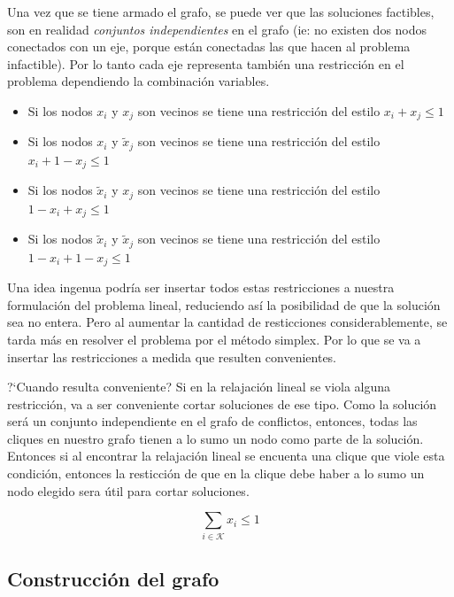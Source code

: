 Una vez que se tiene armado el grafo, se puede ver que las soluciones factibles, son en realidad \emph{conjuntos independientes} en el grafo
(ie: no existen dos nodos conectados con un eje, porque est\'an conectadas las que hacen al problema infactible). Por lo tanto cada eje representa
tambi\'en una restricci\'on en el problema dependiendo la combinaci\'on variables.

\begin{itemize}
\item Si los nodos $x_i$ y $x_j$ son vecinos se tiene una restricci\'on del estilo $x_i +x_j \leq 1$
\item Si los nodos $x_i$ y $\tilde{x}_j$ son vecinos se tiene una restricci\'on del estilo $x_i + 1-x_j \leq 1$
\item Si los nodos $\tilde{x}_i$ y $x_j$ son vecinos se tiene una restricci\'on del estilo $1-x_i +x_j \leq 1$
\item Si los nodos $\tilde{x}_i$ y $\tilde{x}_j$ son vecinos se tiene una restricci\'on del estilo $1-x_i + 1-x_j \leq 1$
\end{itemize}

Una idea ingenua podr\'ia ser insertar todos estas restricciones a nuestra formulaci\'on del problema lineal, reduciendo as\'i la posibilidad de que la soluci\'on sea no entera.
Pero al aumentar la cantidad de resticciones considerablemente, se tarda m\'as en resolver el problema por el m\'etodo simplex. Por lo que se va
a insertar las restricciones a medida que resulten convenientes.

?`Cuando resulta conveniente? Si en la relajaci\'on lineal se viola alguna restricci\'on, va a ser conveniente cortar soluciones de ese tipo.
Como la soluci\'on ser\'a un conjunto independiente en el grafo de conflictos, entonces, todas las cliques en nuestro grafo tienen a lo sumo
un nodo como parte de la soluci\'on. Entonces si al encontrar la relajaci\'on lineal se encuenta una clique que viole esta condici\'on, entonces
la resticci\'on de que en la clique debe haber a lo sumo un nodo elegido sera \'util para cortar soluciones.

\begin{equation} \label{eq3}
\sum\limits_{i \in \mathcal{K}} x_i \leq 1
\end{equation}

\bigskip
\subsection{Construcci\'on del grafo}

